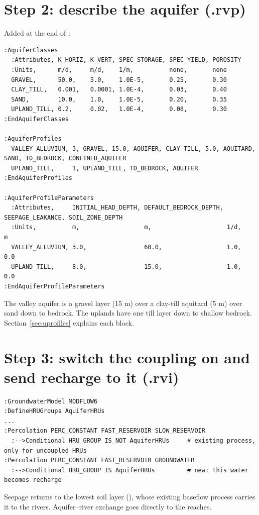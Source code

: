 \section{Step 2: describe the aquifer (.rvp)}
Added at the end of :
\begin{lstlisting}
:AquiferClasses
  :Attributes, K_HORIZ, K_VERT, SPEC_STORAGE, SPEC_YIELD, POROSITY
  :Units,      m/d,     m/d,    1/m,          none,       none
  GRAVEL,      50.0,    5.0,    1.0E-5,       0.25,       0.30
  CLAY_TILL,   0.001,   0.0001, 1.0E-4,       0.03,       0.40
  SAND,        10.0,    1.0,    1.0E-5,       0.20,       0.35
  UPLAND_TILL, 0.2,     0.02,   1.0E-4,       0.08,       0.30
:EndAquiferClasses

:AquiferProfiles
  VALLEY_ALLUVIUM, 3, GRAVEL, 15.0, AQUIFER, CLAY_TILL, 5.0, AQUITARD, SAND, TO_BEDROCK, CONFINED_AQUIFER
  UPLAND_TILL,     1, UPLAND_TILL, TO_BEDROCK, AQUIFER
:EndAquiferProfiles

:AquiferProfileParameters
  :Attributes,     INITIAL_HEAD_DEPTH, DEFAULT_BEDROCK_DEPTH, SEEPAGE_LEAKANCE, SOIL_ZONE_DEPTH
  :Units,          m,                  m,                     1/d,              m
  VALLEY_ALLUVIUM, 3.0,                60.0,                  1.0,              0.0
  UPLAND_TILL,     8.0,                15.0,                  1.0,              0.0
:EndAquiferProfileParameters
\end{lstlisting}
The valley aquifer is a gravel layer (15 m) over a clay-till aquitard (5 m) over sand down to bedrock. The uplands have
one till layer down to shallow bedrock. Section~\ref{sec:uprofiles} explains each block.

\section{Step 3: switch the coupling on and send recharge to it (.rvi)}
\par\noindent\begin{minipage}{\linewidth}
\begin{lstlisting}
:GroundwaterModel MODFLOW6
:DefineHRUGroups AquiferHRUs
...
:Percolation PERC_CONSTANT FAST_RESERVOIR SLOW_RESERVOIR
  :-->Conditional HRU_GROUP IS_NOT AquiferHRUs     # existing process, only for uncoupled HRUs
:Percolation PERC_CONSTANT FAST_RESERVOIR GROUNDWATER
  :-->Conditional HRU_GROUP IS AquiferHRUs         # new: this water becomes recharge
\end{lstlisting}
\end{minipage}\par\smallskip
Seepage returns to the lowest soil layer (), whose existing baseflow process carries it to the
rivers. Aquifer--river exchange goes directly to the reaches.

